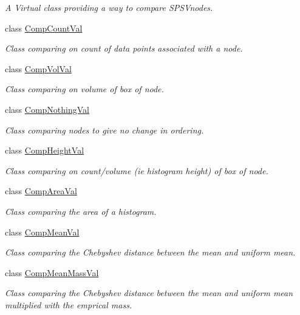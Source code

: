 \begin{DoxyCompactItemize}
\begin{DoxyCompactList}\small\item\em \-A \-Virtual class providing a way to compare \-S\-P\-S\-Vnodes. \end{DoxyCompactList}\item 
class \hyperlink{classsubpavings_1_1CompCountVal}{\-Comp\-Count\-Val}
\begin{DoxyCompactList}\small\item\em \-Class comparing on count of data points associated with a node. \end{DoxyCompactList}\item 
class \hyperlink{classsubpavings_1_1CompVolVal}{\-Comp\-Vol\-Val}
\begin{DoxyCompactList}\small\item\em \-Class comparing on volume of box of node. \end{DoxyCompactList}\item 
class \hyperlink{classsubpavings_1_1CompNothingVal}{\-Comp\-Nothing\-Val}
\begin{DoxyCompactList}\small\item\em \-Class comparing nodes to give no change in ordering. \end{DoxyCompactList}\item 
class \hyperlink{classsubpavings_1_1CompHeightVal}{\-Comp\-Height\-Val}
\begin{DoxyCompactList}\small\item\em \-Class comparing on count/volume (ie histogram height) of box of node. \end{DoxyCompactList}\item 
class \hyperlink{classsubpavings_1_1CompAreaVal}{\-Comp\-Area\-Val}
\begin{DoxyCompactList}\small\item\em \-Class comparing the area of a histogram. \end{DoxyCompactList}\item 
class \hyperlink{classsubpavings_1_1CompMeanVal}{\-Comp\-Mean\-Val}
\begin{DoxyCompactList}\small\item\em \-Class comparing the \-Chebyshev distance between the mean and uniform mean. \end{DoxyCompactList}\item 
class \hyperlink{classsubpavings_1_1CompMeanMassVal}{\-Comp\-Mean\-Mass\-Val}
\begin{DoxyCompactList}\small\item\em \-Class comparing the \-Chebyshev distance between the mean and uniform mean multiplied with the emprical mass. \end{DoxyCompactList}\item 

\end{DoxyCompactItemize}
